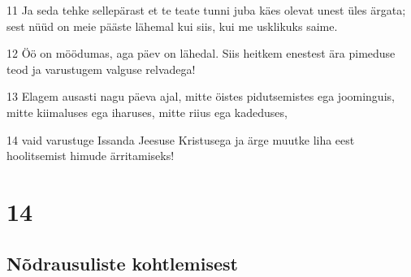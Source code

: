 \par 11 Ja seda tehke sellepärast et te teate tunni juba käes olevat unest üles ärgata; sest nüüd on meie pääste lähemal kui siis, kui me usklikuks saime.
\par 12 Öö on möödumas, aga päev on lähedal. Siis heitkem enestest ära pimeduse teod ja varustugem valguse relvadega!
\par 13 Elagem ausasti nagu päeva ajal, mitte öistes pidutsemistes ega joominguis, mitte kiimaluses ega iharuses, mitte riius ega kadeduses,
\par 14 vaid varustuge Issanda Jeesuse Kristusega ja ärge muutke liha eest hoolitsemist himude ärritamiseks!


\chapter{14}

\section*{Nõdrausuliste kohtlemisest}


